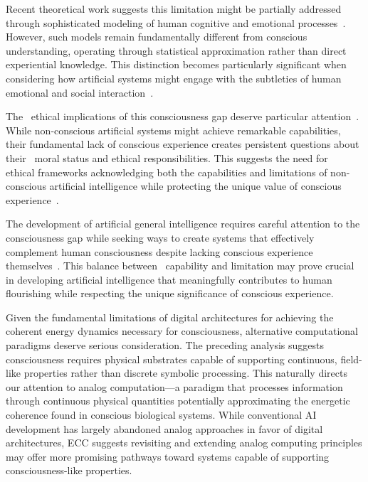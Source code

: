 Recent theoretical work suggests this limitation might be partially addressed through sophisticated modeling of human cognitive and emotional processes~\cite{Lake2017, barrett2017emotions}. However, such models remain fundamentally different from conscious understanding, operating through statistical approximation rather than direct experiential knowledge. This distinction becomes particularly significant when considering how artificial systems might engage with the subtleties of human emotional and social interaction~\cite{Marcus2019, mercier2017enigma}.

The~ ethical implications of this consciousness gap deserve particular attention~\cite{Bostrom2014}. While non-conscious artificial systems might achieve remarkable capabilities, their fundamental lack of conscious experience creates persistent questions about their~ moral status and ethical responsibilities. This suggests the need for~ ethical frameworks acknowledging both the capabilities and limitations of non-conscious artificial intelligence while protecting the unique value of conscious experience~\cite{Tegmark2017, seth2021being}.

The development of artificial general intelligence requires careful attention to the consciousness gap while seeking ways to create systems that effectively complement human consciousness despite lacking conscious experience themselves~\cite{Searle2004, Mashour2020}. This balance between~ capability and limitation may prove crucial in developing artificial intelligence that meaningfully contributes to human flourishing while respecting the unique significance of conscious experience.

Given the fundamental limitations of digital architectures for achieving the coherent energy dynamics necessary for consciousness, alternative computational paradigms deserve serious consideration. The preceding analysis suggests consciousness requires physical substrates capable of supporting continuous, field-like properties rather than discrete symbolic processing. This naturally directs our attention to analog computation—a paradigm that processes information through continuous physical quantities potentially approximating the energetic coherence found in conscious biological systems. While conventional AI development has largely abandoned analog approaches in favor of digital architectures, ECC suggests revisiting and extending analog computing principles may offer more promising pathways toward systems capable of supporting consciousness-like properties.
